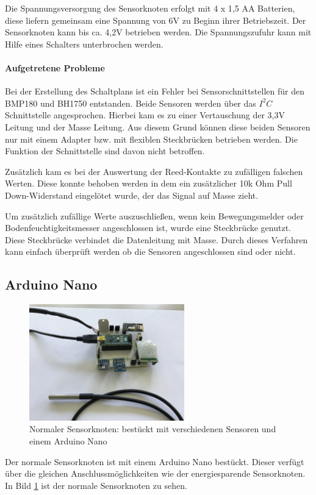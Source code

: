 Die Spannungsversorgung des Sensorknoten erfolgt mit 4 x 1,5 AA Batterien, diese liefern gemeinsam eine Spannung von 6V zu Beginn ihrer Betriebszeit. Der Sensorknoten kann bis ca. 4,2V betrieben werden. Die Spannungszufuhr kann mit Hilfe eines Schalters unterbrochen werden. 
\paragraph{Aufgetretene Probleme} Bei der Erstellung des Schaltplans ist ein Fehler bei Sensorschnittstellen für den BMP180 und BH1750 entstanden. Beide Sensoren werden über das $I^2C$ Schnittstelle angesprochen. Hierbei kam es zu einer Vertauschung der 3,3V Leitung und der Masse Leitung. Aus diesem Grund können diese beiden Sensoren nur mit einem Adapter bzw. mit flexiblen Steckbrücken betrieben werden. Die Funktion der Schnittstelle sind davon nicht betroffen. 

Zusätzlich kam es bei der Auswertung der Reed-Kontakte zu zufälligen falschen Werten. Diese konnte behoben werden in dem ein zusätzlicher 10k Ohm Pull Down-Widerstand eingelötet wurde, der das Signal auf Masse zieht.

Um zusätzlich zufällige Werte auszuschließen, wenn kein Bewegungsmelder oder Bodenfeuchtigkeitsmesser angeschlossen ist, wurde eine Steckbrücke genutzt. Diese Steckbrücke verbindet die Datenleitung mit Masse.  Durch dieses Verfahren kann einfach überprüft werden ob die Sensoren angeschlossen sind oder nicht.
\label{sec:ArduinoProMini}
\subsection{Arduino Nano}
\label{sec:ArduinoNano}
\begin{figure}
	\centering
	\includegraphics[width=0.6\textwidth]{bilder/SensorknotenArduinoNano}
	\caption[Normaler Sensorknoten]{Normaler Sensorknoten: bestückt mit verschiedenen Sensoren und einem Arduino Nano}
	\label{img:ArduinoNano}
\end{figure}
Der normale Sensorknoten ist mit einem Arduino Nano bestückt. Dieser verfügt über die gleichen Anschlussmöglichkeiten wie der energiesparende Sensorknoten. In Bild \ref{img:ArduinoNano} ist der normale Sensorknoten zu sehen.
